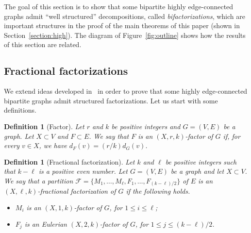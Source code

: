 \documentclass[12pt,reqno,a4paper]{amsart}
\newtheorem{definition}[theorem]{Definition}
\begin{document}
The goal of this section is to show that some bipartite highly edge-connected 
graphs
admit ``well structured'' decompositions, called \emph{bifactorizations}, which 
are important structures in 
the proof of the main theorems of this paper (shown in Section~\ref{section:high}). 
The diagram of Figure~\ref{fig:outline} shows how the results of this section are related.

\subsection{Fractional factorizations}\label{section:fractional}

We extend ideas developed in~\cite{BoMoOsWa14+} in 
order to prove that some highly edge-connected bipartite 
graphs admit structured factorizations. Let us start with some definitions.


\begin{definition}[Factor]
	Let $r$ and $k$ be positive integers and \(G=(V,E)\) be a graph. Let 
\(X\subset V\) and \(F \subset E\).
	We say that \(F\) is an \emph{\((X,r,k)\)-factor} of 
\(G\) if, for every \(v\in X\), we have \(d_F(v) = (r/k)d_G(v)\).
\end{definition}




\begin{definition}[Fractional factorization]
Let \(k\) and \(\ell\) be positive integers such that $k-\ell$ is a 
positive even number. Let $G=(V,E)$ be a graph and let \(X\subset V\).
We say that a partition \(\mathcal{F}=\{M_1,\ldots,M_\ell,F_1,\ldots,F_{(k-\ell)/2}\}\) of $E$ is an 
\emph{\((X,\ell,k)\)-fractional factorization} of $G$ if the following holds.
	\begin{itemize}
		\item \(M_i\) is an \((X,1,k)\)-factor of $G$, for $1\leq i\leq \ell$;
		\item \(F_j\) is an Eulerian \((X,2,k)\)-factor of $G$, for $1\leq j\leq (k-\ell)/2$.	
	\end{itemize}
\end{definition}
\end{document}
